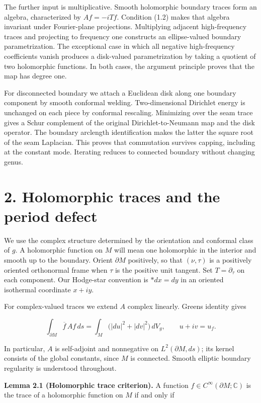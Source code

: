 \documentclass[11pt]{article}
\begin{document}
The further input is multiplicative. Smooth holomorphic boundary traces
form an algebra, characterized by \(Af=-iTf\). Condition (1.2) makes
that algebra invariant under Fourier-plane projections. Multiplying
adjacent high-frequency traces and projecting to frequency one
constructs an ellipse-valued boundary parametrization. The exceptional
case in which all negative high-frequency coefficients vanish produces a
disk-valued parametrization by taking a quotient of two holomorphic
functions. In both cases, the argument principle proves that the map has
degree one.

For disconnected boundary we attach a Euclidean disk along one boundary
component by smooth conformal welding. Two-dimensional Dirichlet energy
is unchanged on each piece by conformal rescaling. Minimizing over the
seam trace gives a Schur complement of the original Dirichlet-to-Neumann
map and the disk operator. The boundary arclength identification makes
the latter the square root of the seam Laplacian. This proves that
commutation survives capping, including at the constant mode. Iterating
reduces to connected boundary without changing genus.

\section{2. Holomorphic traces and the period
defect}\label{holomorphic-traces-and-the-period-defect}

We use the complex structure determined by the orientation and conformal
class of \(g\). A holomorphic function on \(M\) will mean one
holomorphic in the interior and smooth up to the boundary. Orient
\(\partial M\) positively, so that \((\nu,\tau)\) is a positively
oriented orthonormal frame when \(\tau\) is the positive unit tangent.
Set \(T=\partial_\tau\) on each component. Our Hodge-star convention is
\(*dx=dy\) in an oriented isothermal coordinate \(x+iy\).

For complex-valued traces we extend \(A\) complex linearly.
Green\textquotesingle s identity gives

\[
\int_{\partial M}\overline f\,Af\,ds
=\int_M\bigl(|du|^2+|dv|^2\bigr)\,dV_g,
\qquad u+iv=u_f.
\tag{2.1}
\]

In particular, \(A\) is self-adjoint and nonnegative on
\(L^2(\partial M,ds)\); its kernel consists of the global constants,
since \(M\) is connected. Smooth elliptic boundary regularity is
understood throughout.

\textbf{Lemma 2.1 (Holomorphic trace criterion).} A function
\(f\in C^\infty(\partial M;\mathbb C)\) is the trace of a holomorphic
function on \(M\) if and only if
\end{document}
